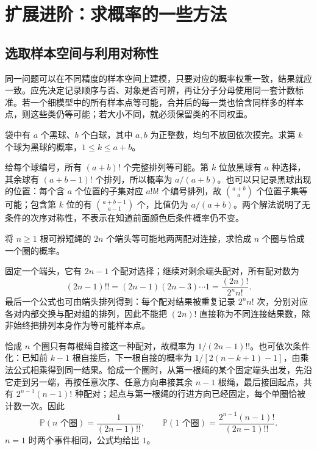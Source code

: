 \section{扩展进阶：求概率的一些方法}
\label{sec:study-probability-methods}

\subsection{选取样本空间与利用对称性}
\label{subsec:study-probability-space-choice}

同一问题可以在不同精度的样本空间上建模，只要对应的概率权重一致，结果就应一致。应先决定记录顺序与否、对象是否可辨，再让分子分母使用同一套计数标准。若一个细模型中的所有样本点等可能，合并后的每一类也恰含同样多的样本点，则这些类仍等可能；若大小不同，就必须保留类的不同权重。

\begin{example}
\label{ex:study-kth-black-ball}
袋中有 $a$ 个黑球、$b$ 个白球，其中 $a,b$ 为正整数，均匀不放回依次摸完。求第 $k$ 个球为黑球的概率，$1\le k\le a+b$。
\end{example}

\begin{solve}
给每个球编号，所有 $(a+b)!$ 个完整排列等可能。第 $k$ 位放黑球有 $a$ 种选择，其余球有 $(a+b-1)!$ 个排列，所以概率为 $a/(a+b)$。也可以只记录黑球出现的位置：每个含 $a$ 个位置的子集对应 $a!b!$ 个编号排列，故 $\binom{a+b}{a}$ 个位置子集等可能；包含第 $k$ 位的有 $\binom{a+b-1}{a-1}$ 个，比值仍为 $a/(a+b)$。两个解法说明了无条件的次序对称性，不表示在知道前面颜色后条件概率仍不变。
\end{solve}

\begin{example}
\label{ex:study-rope-pairings}
将 $n\ge1$ 根可辨短绳的 $2n$ 个端头等可能地两两配对连接，求恰成 $n$ 个圈与恰成一个圈的概率。
\end{example}

\begin{solve}
固定一个端头，它有 $2n-1$ 个配对选择；继续对剩余端头配对，所有配对数为
\[
 (2n-1)!!=(2n-1)(2n-3)\cdots1
 =\frac{(2n)!}{2^n n!}.
\]
最后一个公式也可由端头排列得到：每个配对结果被重复记录 $2^n n!$ 次，分别对应各对内部交换与配对组的排列，因此不能把 $(2n)!$ 直接称为不同连接结果数，除非始终把排列本身作为等可能样本点。

恰成 $n$ 个圈只有每根绳自接这一种配对，故概率为 $1/(2n-1)!!$。也可依次条件化：已知前 $k-1$ 根自接后，下一根自接的概率为 $1/[2(n-k+1)-1]$，由乘法公式相乘得到同一结果。恰成一个圈时，从第一根绳的某个固定端头出发，先沿它走到另一端，再按任意次序、任意方向串接其余 $n-1$ 根绳，最后接回起点，共有 $2^{n-1}(n-1)!$ 种配对；起点与第一根绳的行进方向已经固定，每个单圈恰被计数一次。因此
\begin{equation}
 \mathbb P(n\text{ 个圈})=\frac1{(2n-1)!!},\qquad
 \mathbb P(1\text{ 个圈})=\frac{2^{n-1}(n-1)!}{(2n-1)!!}.
 \label{eq:study-rope-probabilities}
\end{equation}
$n=1$ 时两个事件相同，公式均给出 $1$。
\end{solve}


